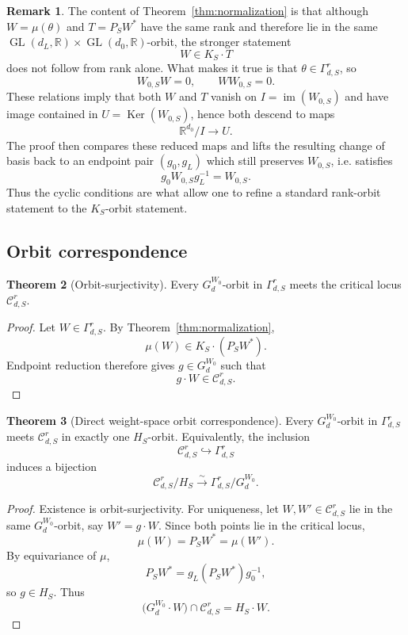 \documentclass[11pt]{article}
\newcommand{\im}{\operatorname{im}}
\newcommand{\Ker}{\operatorname{Ker}}
\newcommand{\GL}{\operatorname{GL}}
\newcommand{\R}{\mathbb{R}}
\theoremstyle{definition}
\newtheorem{theorem}{Theorem}[section]
\newtheorem{remark}[theorem]{Remark}
\begin{document}
\begin{remark}
The content of Theorem~\ref{thm:normalization} is that although \(W=\mu(\theta)\) and
\(T=P_SW^\ast\) have the same rank and therefore lie in the same
\(\GL(d_L,\R)\times \GL(d_0,\R)\)-orbit, the stronger statement
\[
W\in K_S\cdot T
\]
does not follow from rank alone. What makes it true is that
\(\theta\in \Gamma_{d,S}^r\), so
\[
W_{0,S}W=0,
\qquad
WW_{0,S}=0.
\]
These relations imply that both \(W\) and \(T\) vanish on
\(I=\im(W_{0,S})\) and have image contained in \(U=\Ker(W_{0,S})\), hence both descend
to maps
\[
\R^{d_0}/I\to U.
\]
The proof then compares these reduced maps and lifts the resulting change of basis back
to an endpoint pair \((g_0,g_L)\) which still preserves \(W_{0,S}\), i.e.
satisfies
\[
g_0W_{0,S}g_L^{-1}=W_{0,S}.
\]
Thus the cyclic conditions are what allow one to refine a standard rank-orbit
statement to the \(K_S\)-orbit statement.
\end{remark}
\subsection{Orbit correspondence}

\begin{theorem}[Orbit-surjectivity]
Every \(G_d^{W_0}\)-orbit in \(\Gamma_{d,S}^r\) meets the critical locus
\(\mathcal C_{d,S}^r\).
\end{theorem}

\begin{proof}
Let \(W\in \Gamma_{d,S}^r\). By Theorem~\ref{thm:normalization},
\[
\mu(W)\in K_S\cdot (P_SW^\ast).
\]
Endpoint reduction therefore gives \(g\in G_d^{W_0}\) such that
\[
g\cdot W\in \mathcal C_{d,S}^r.
\]
\end{proof}

\begin{theorem}[Direct weight-space orbit correspondence]
\label{thm:orbit-bijection}
Every \(G_d^{W_0}\)-orbit in \(\Gamma_{d,S}^r\) meets \(\mathcal C_{d,S}^r\) in
exactly one \(H_S\)-orbit. Equivalently, the inclusion
\[
\mathcal C_{d,S}^r\hookrightarrow \Gamma_{d,S}^r
\]
induces a bijection
\[
\mathcal C_{d,S}^r/H_S
\xrightarrow{\sim}
\Gamma_{d,S}^r/G_d^{W_0}.
\]
\end{theorem}

\begin{proof}
Existence is orbit-surjectivity. For uniqueness, let \(W,W'\in \mathcal C_{d,S}^r\)
lie in the same \(G_d^{W_0}\)-orbit, say \(W'=g\cdot W\). Since both points lie
in the critical locus,
\[
\mu(W)=P_SW^\ast=\mu(W').
\]
By equivariance of \(\mu\),
\[
P_SW^\ast
=
g_L(P_SW^\ast)g_0^{-1},
\]
so \(g\in H_S\). Thus
\[
\bigl(G_d^{W_0}\cdot W\bigr)\cap \mathcal C_{d,S}^r=H_S\cdot W.
\]
\end{proof}
\end{document}
